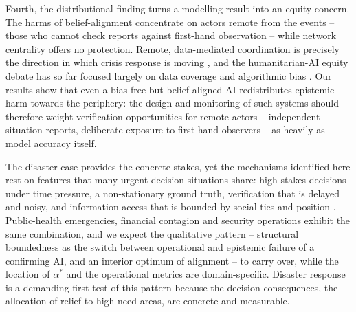 \documentclass[pdflatex,sn-nature]{sn-jnl}
\begin{document}
Fourth, the distributional finding turns a modelling result into an equity concern. The harms of belief-alignment concentrate on actors remote from the events -- those who cannot check reports against first-hand observation -- while network centrality offers no protection. Remote, data-mediated coordination is precisely the direction in which crisis response is moving \citep{comes2020coordination}, and the humanitarian-AI equity debate has so far focused largely on data coverage and algorithmic bias \citep{coleman2024weaving}. Our results show that even a bias-free but belief-aligned AI redistributes epistemic harm towards the periphery: the design and monitoring of such systems should therefore weight verification opportunities for remote actors -- independent situation reports, deliberate exposure to first-hand observers -- as heavily as model accuracy itself.

The disaster case provides the concrete stakes, yet the mechanisms identified here rest on features that many urgent decision situations share: high-stakes decisions under time pressure, a non-stationary ground truth, verification that is delayed and noisy, and information access that is bounded by social ties and position \citep{svenson1993time,mendonca2001decision,holguin2012unique}. Public-health emergencies, financial contagion and security operations exhibit the same combination, and we expect the qualitative pattern -- structural boundedness as the switch between operational and epistemic failure of a confirming AI, and an interior optimum of alignment -- to carry over, while the location of $\alpha^{*}$ and the operational metrics are domain-specific. Disaster response is a demanding first test of this pattern because the decision consequences, the allocation of relief to high-need areas, are concrete and measurable.
\end{document}
